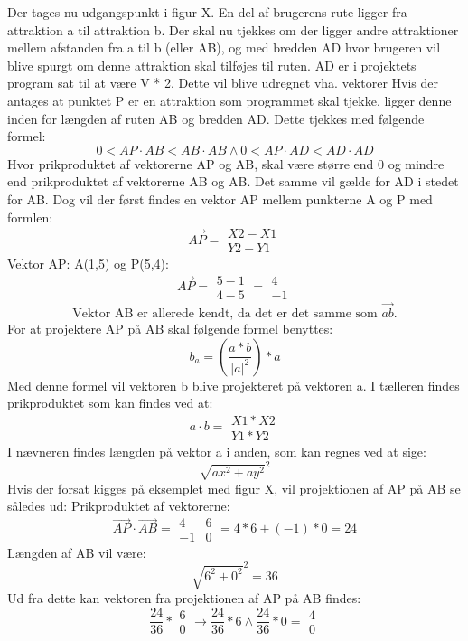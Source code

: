 Der tages nu udgangspunkt i figur X. En del af brugerens rute ligger fra attraktion a til attraktion b. Der skal nu tjekkes om der ligger andre attraktioner mellem afstanden fra a til b (eller AB), og med bredden AD hvor brugeren vil blive spurgt om denne attraktion skal tilføjes til ruten. AD er i projektets program sat til at være V * 2. Dette vil blive udregnet vha. vektorer 
Hvis der antages at punktet P er en attraktion som programmet skal tjekke, ligger denne inden for længden af ruten AB og bredden AD. Dette tjekkes med følgende formel:
\[0 < AP \cdot AB < AB \cdot AB \wedge 0 < AP \cdot AD < AD \cdot AD \]
Hvor prikproduktet af vektorerne AP og AB, skal være større end 0 og mindre end prikproduktet af vektorerne AB og AB. Det samme vil gælde for AD i stedet for AB.
Dog vil der først findes en vektor AP mellem punkterne A og P med formlen: \[ \overrightarrow{AP} = \begin{matrix}X2-X1 \\ Y2-Y1\end{matrix} \]
Vektor AP: A(1,5) og P(5,4): \[ \overrightarrow{AP} = \begin{matrix}5-1 \\ 4-5\end{matrix} = \begin{matrix} 4 \\ -1 \end{matrix} \]
\[ \text{Vektor AB er allerede kendt, da det er det samme som } \overrightarrow{ab} \text{.} \]
For at projektere AP på AB skal følgende formel benyttes: \[ b_{a} = (\frac{a*b}{|a|^2}) * a \]
Med denne formel vil vektoren b blive projekteret på vektoren a. I tælleren findes prikproduktet som kan findes ved at: \[ a \cdot b = \begin{matrix}X1 * X2 \\ Y1 * Y2\end{matrix}  \]
I nævneren findes længden på vektor a i anden, som kan regnes ved at sige: \[ \sqrt{ax^2+ay^2}^2 \]
Hvis der forsat kigges på eksemplet med figur X, vil projektionen af AP på AB se således ud:
Prikproduktet af vektorerne: \[ \overrightarrow{AP} \cdot \overrightarrow{AB} = \begin{matrix} 4 & 6 \\ -1 & 0 \end{matrix} = 4*6+(-1)*0 = 24 \]
Længden af AB vil være: \[ \sqrt{6^2+0^2}^2 = 36 \]
Ud fra dette kan vektoren fra projektionen af AP på AB findes: 
\[ \frac{24}{36} * \begin{matrix} 6 \\ 0 \end{matrix} \rightarrow \frac{24}{36} * 6 \wedge \frac{24}{36} * 0 = \begin{matrix} 4 \\ 0 \end{matrix} \]

